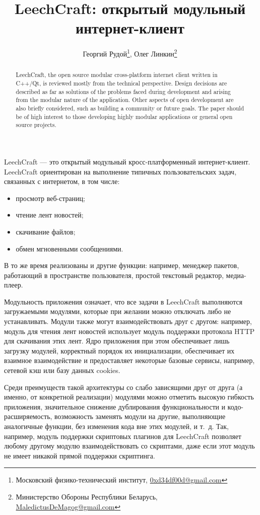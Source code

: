 \documentclass[10pt, a5paper]{article}
\begin{document}
\title{LeechCraft: открытый модульный интернет-клиент}

\author{Георгий Рудой\footnote{Московский физико-технический институт, \url{0xd34df00d@gmail.com}}, Олег Линкин\footnote{Министерство Обороны Республики Беларусь, \url{MaledictusDeMagog@gmail.com}}}
\date{}
\maketitle

\begin{abstract}
LeechCraft, the open source modular
cross-platform internet client written in C++/Qt, is reviewed mostly from the
technical perspective. Design decisions are described as far as solutions of
the problems faced during development and arising from the modular
nature of the application. Other aspects of open de\-ve\-lop\-ment are also
briefly considered, such as building a community or future goals. 
The paper should be of high interest to those de\-ve\-loping highly modular
applications or general open source projects.
\end{abstract}

LeechCraft --- это открытый модульный кросс-платформенный
интернет-клиент. LeechCraft ориентирован на выполнение типичных
пользовательских задач, связанных с интернетом, в том числе:
\begin{itemize}
	\item просмотр веб-страниц;
	\item чтение лент новостей;
	\item скачивание файлов;
	\item обмен мгновенными сообщениями. 
\end{itemize}
В то же время реализованы и другие функции: например, менеджер
пакетов, работающий в пространстве пользователя, простой текстовый
редактор, медиа-плеер.

Модульность приложения означает, что все задачи в LeechCraft
выполняются загружаемыми модулями, которые при желании можно отключать
либо не устанавливать. Модули также могут взаимодействовать друг с
другом: например, модуль для чтения лент новостей использует модуль
поддержки протокола HTTP для скачивания этих лент. Ядро приложения при
этом обеспечивает лишь загрузку модулей, корректный порядок их
инициализации, обеспечивает их взаимное взаимодействие и предоставляет
некоторые базовые сервисы, например, сетевой кэш или базу данных
cookies.

Среди преимуществ такой архитектуры со слабо зависящими друг от друга
(а именно, от конкретной реализации) модулями можно отметить высокую
гибкость приложения, значительное снижение дублирования
функциональности и кодо-расширяемость, возможность заменять модули на
другие, выполняющие аналогичные функции, без изменения кода вне этих
модулей, и т.~д. Так, например, модуль поддержки скриптовых плагинов
для LeechCraft позволяет любому другому модулю взаимодействовать со
скриптами, даже если этот модуль не имеет никакой прямой поддержки скриптинга.
\end{document}
